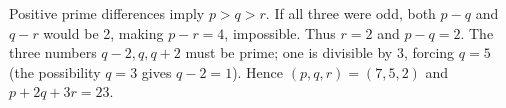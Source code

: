 Positive prime differences imply $p>q>r$. If all three were odd, both $p-q$ and $q-r$ would be 2, making $p-r=4$, impossible. Thus $r=2$ and $p-q=2$. The three numbers $q-2,q,q+2$ must be prime; one is divisible by 3, forcing $q=5$ (the possibility $q=3$ gives $q-2=1$). Hence $(p,q,r)=(7,5,2)$ and $p+2q+3r=\boxed{23}$.
